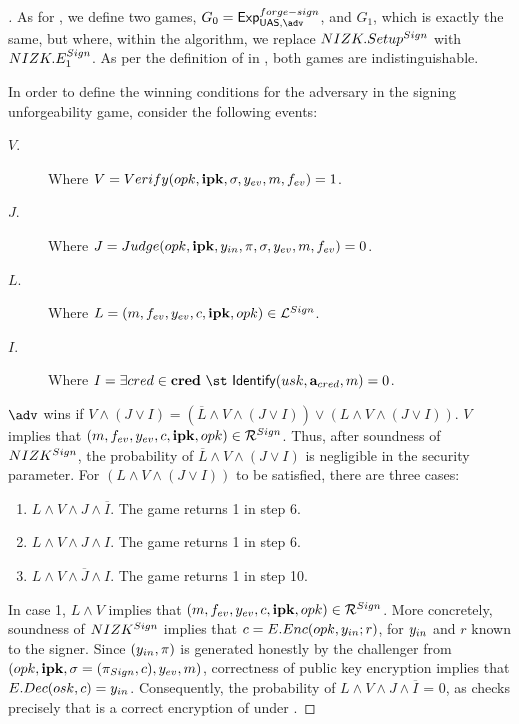 \begin{proof}[]
  As for , we define two games, $G_0=\ExpForgeSign$,
  and $G_1$, which is exactly the same, but where, within the \Setup algorithm,
  we replace $NIZK.Setup^{Sign}$ with $NIZK.E_1^{Sign}$. As per the
  definition of \NIZK in , both games are indistinguishable.

  In order to define the winning conditions for the adversary in the signing
  unforgeability game, consider the following events:

  \begin{description}
  \item[$V$.] Where $V = Verify(opk,\mathbf{ipk},\sigma,y_{ev},m,f_{ev}) = 1$.
  \item[$J$.] Where $J = Judge(opk,\mathbf{ipk},y_{in},\pi,\sigma,y_{ev},m,
    f_{ev}) = 0$.
  \item[$L$.] Where $L = (m,f_{ev},y_{ev},c,\mathbf{ipk},opk) \in
    \mathcal{L}^{Sign}$.    
  \item[$I$.] Where $I = \exists \cred \in \scred~\st~\Identify(\usk,
    \attrs_{\cred},\msg) = 0$.
  \end{description}

  $\adv$ wins if $V \land (J \lor I) = (\overline{L} \land V \land (J \lor I))
  \lor (L \land V \land (J \lor I))$.
  $V$ implies that $(m,f_{ev},y_{ev},c,\mathbf{ipk},opk) \in \mathcal{R}^{Sign}$.
  Thus, after soundness of $NIZK^{Sign}$, the probability of $\overline{L}
  \land V \land (J \lor I)$ is negligible in the security parameter.
  For $(L \land V \land (J \lor I))$ to be satisfied, there are three cases:
  \begin{enumerate}
  \item $L \land V \land J \land \overline{I}$. The game returns 1 in step 6.
  \item $L \land V \land J \land I$.  The game returns 1 in step 6.
  \item $L \land V \land \overline{J} \land I$. The game returns 1 in step 10. 
  \end{enumerate}

  In case 1, $L \land V$ implies that $(m,f_{ev},y_{ev},c,\mathbf{ipk},opk) \in
  \mathcal{R}^{Sign}$. More concretely, soundness of $NIZK^{Sign}$ implies that
  $c = E.Enc(opk,y_{in};r)$, for $y_{in}$ and $r$ known to the signer. Since
  $(y_{in},\pi)$ is generated honestly by the challenger from
  $(opk,\mathbf{ipk},\sigma = (\pi_{Sign},c),y_{ev},m)$, correctness of
  public key encryption implies that $E.Dec(osk,c) = y_{in}$. Consequently,
  the probability of $L \land V \land J \land \overline{I}$ = 0, as \Judge
  checks precisely that \Ec is a correct encryption of \yinsp under \opk.


\end{proof}
